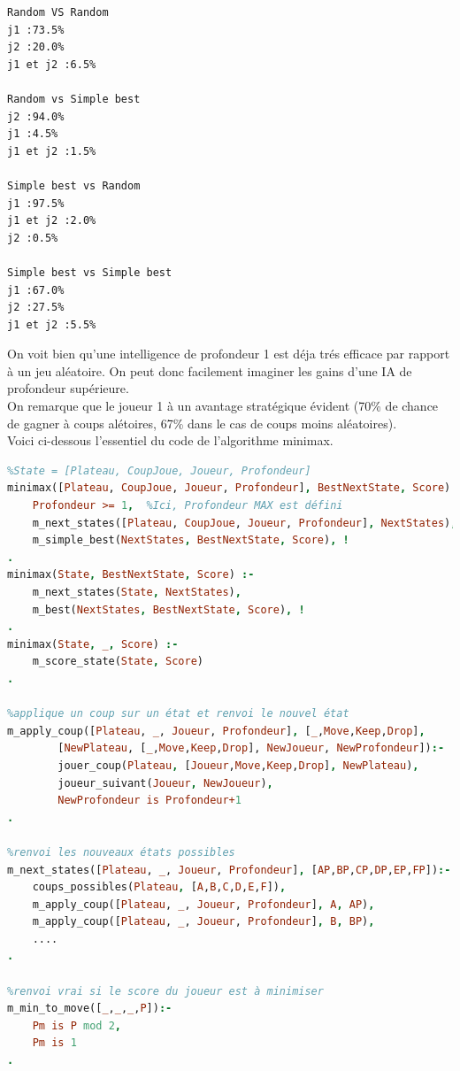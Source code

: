 \documentclass[11pt,a4paper,twoside,french,svgnames]{report}
\begin{document}
\begin{center}
\begin{lstlisting}
Random VS Random
j1 :73.5%
j2 :20.0%
j1 et j2 :6.5%

Random vs Simple best
j2 :94.0%
j1 :4.5%
j1 et j2 :1.5%

Simple best vs Random
j1 :97.5%
j1 et j2 :2.0%
j2 :0.5%

Simple best vs Simple best
j1 :67.0%
j2 :27.5%
j1 et j2 :5.5%
\end{lstlisting}

On voit bien qu'une intelligence de profondeur 1 est déja trés efficace par rapport à un jeu aléatoire. On peut donc facilement imaginer les gains d'une IA de profondeur supérieure.
\\

On remarque que le joueur 1 à un avantage stratégique évident (70\% de chance de gagner à coups alétoires, 67\% dans le cas de coups moins aléatoires).
\\

Voici ci-dessous l'essentiel du code de l'algorithme minimax.

\begin{lstlisting}[language=prolog]
%Pour un état donné, retourne le meilleur coup minimax
%State = [Plateau, CoupJoue, Joueur, Profondeur]
minimax([Plateau, CoupJoue, Joueur, Profondeur], BestNextState, Score) :-
    Profondeur >= 1,  %Ici, Profondeur MAX est défini
    m_next_states([Plateau, CoupJoue, Joueur, Profondeur], NextStates),
    m_simple_best(NextStates, BestNextState, Score), !
.
minimax(State, BestNextState, Score) :-
    m_next_states(State, NextStates),
    m_best(NextStates, BestNextState, Score), !
.
minimax(State, _, Score) :-
    m_score_state(State, Score)
.

%applique un coup sur un état et renvoi le nouvel état
m_apply_coup([Plateau, _, Joueur, Profondeur], [_,Move,Keep,Drop],
        [NewPlateau, [_,Move,Keep,Drop], NewJoueur, NewProfondeur]):-
        jouer_coup(Plateau, [Joueur,Move,Keep,Drop], NewPlateau),
        joueur_suivant(Joueur, NewJoueur),
        NewProfondeur is Profondeur+1
.

%renvoi les nouveaux états possibles
m_next_states([Plateau, _, Joueur, Profondeur], [AP,BP,CP,DP,EP,FP]):-
    coups_possibles(Plateau, [A,B,C,D,E,F]),
    m_apply_coup([Plateau, _, Joueur, Profondeur], A, AP),
    m_apply_coup([Plateau, _, Joueur, Profondeur], B, BP),
    ....
.

%renvoi vrai si le score du joueur est à minimiser
m_min_to_move([_,_,_,P]):-
    Pm is P mod 2,
    Pm is 1
.


\end{lstlisting}
\end{center}
\end{document}
